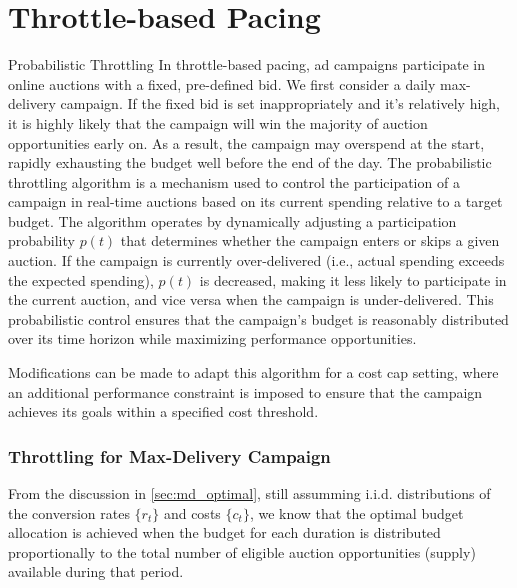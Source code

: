 \documentclass[../main.tex]{subfiles}
\begin{document}
	\chapter{Throttle-based Pacing}
	
	
\begin{section}{Probabilistic Throttling}
	In throttle-based pacing, ad campaigns participate in online auctions with a fixed, pre-defined bid. We first consider a daily max-delivery campaign. If the fixed bid is set inappropriately and it's relatively high, it is highly likely that the campaign will win the majority of auction opportunities early on. As a result, the campaign may overspend at the start, rapidly exhausting the budget well before the end of the day. The probabilistic throttling algorithm is a mechanism used to control the participation of a campaign in real-time auctions based on its current spending relative to a target budget. The algorithm operates by dynamically adjusting a participation probability $p(t)$ that determines whether the campaign enters or skips a given auction. If the campaign is currently over-delivered (i.e., actual spending exceeds the expected spending), $p(t)$ is decreased, making it less likely to participate in the current auction, and vice versa when the campaign is under-delivered. This probabilistic control ensures that the campaign's budget is reasonably distributed over its time horizon while maximizing performance opportunities. 
	
	Modifications can be made to adapt this algorithm for a cost cap setting, where an additional performance constraint is imposed to ensure that the campaign achieves its goals within a specified cost threshold.
	
	\subsection*{Throttling for Max-Delivery Campaign}
	From the discussion in \autoref{sec:md_optimal}, still assumming i.i.d. distributions of the conversion rates $\{r_t\}$ and costs $\{c_t\}$, we know that the optimal budget allocation is achieved when the budget for each duration is distributed proportionally to the total number of eligible auction opportunities (supply) available during that period. 
	

\end{section}
\end{document}
